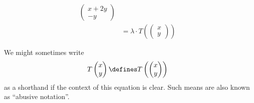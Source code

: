 \begin{exm}
\begin{flushleft}
\begin{enumerate}
\begin{align*}
\begin{pmatrix}
					      x + 2y \\
					      - y
				      \end{pmatrix}                   \\
				       & =\lambda\cdot T\left(\begin{pmatrix}
					      x \\ y
				      \end{pmatrix}\right)
			      \end{align*}
		\end{enumerate}
	\end{flushleft}
\end{exm}

\begin{rem}\label{rem-linear-map-matrix-shorthand}
	We might sometimes write
	\begin{equation*}
		T\begin{pmatrix}
			x \\ y
		\end{pmatrix}\defines
		T\left(\begin{pmatrix}
			x \\ y
		\end{pmatrix}\right)
	\end{equation*}
	as a shorthand if the context of this equation is clear. Such means are also
	known as \enquote{abusive notation}.
\end{rem}

